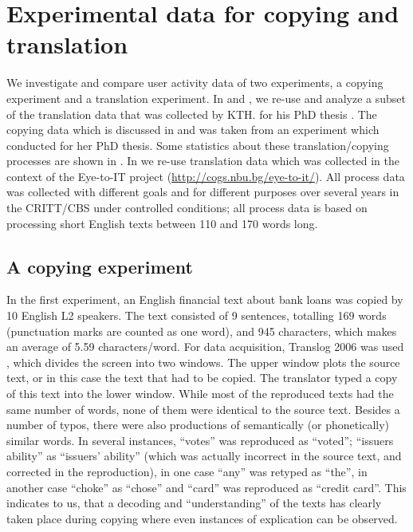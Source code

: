 \documentclass[output=paper]{LSP/langsci}
\begin{document}
\section{Experimental data for copying and translation}\label{sec:carl:2}

We investigate and compare user activity data of two experiments, a copying experiment and a translation experiment. In  and , we re-use and analyze a subset of the translation data that was collected by KTH. \citeauthor{Jensen2011} for his PhD thesis \citep{Jensen2011}. The copying data which is discussed in  and  was taken from an experiment which \citet{Sjørup2011} conducted for her PhD thesis. Some statistics about these translation/copying processes are shown in . In  we re-use translation data which was collected in the context of the Eye-to-IT project (\url{http://cogs.nbu.bg/eye-to-it/}). All process data was collected with different goals and for different purposes over several years in the CRITT/CBS under controlled conditions; all process data is based on processing short English texts between 110 and 170 words long. 

\subsection{A copying experiment}\label{sec:carl:2.1}

In the first experiment, an English financial text about bank loans was copied by 10 English L2 speakers. The text consisted of 9 sentences, totalling 169 words (punctuation marks are counted as one word), and 945 characters, which makes an average of 5.59 characters/word. For data acquisition, Translog{} 2006 was used \citep{Jakobsen1999}, which divides the screen into two windows. The upper window plots the source text, or in this case the text that had to be copied. The translator typed a copy of this text into the lower window. While most of the reproduced texts had the same number of words, none of them were identical to the source text.  Besides a number of typos, there were also productions of semantically (or phonetically) similar words. In several instances, ``votes'' was reproduced as ``voted'';  ``issuers ability'' as ``issuers' ability'' (which was actually incorrect in the source text, and corrected in the reproduction), in one case ``any'' was retyped as ``the'', in another case ``choke'' as ``chose'' and ``card'' was reproduced as ``credit card''. This indicates to us, that a decoding and ``understanding'' of the texts has clearly taken place during copying where even instances of explication can be observed.
\end{document}
